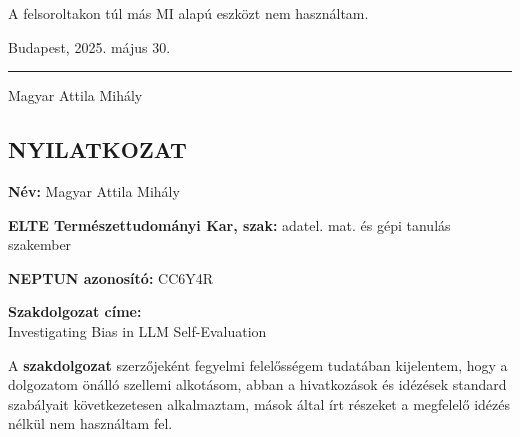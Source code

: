 \documentclass[UTF8,noindent,nohyp,parspace,titlepage,a4paper,12pt]{article}
\begin{document}
      A felsoroltakon túl más MI alapú eszközt nem használtam.

      \vspace{3em}

      \begin{minipage}[t]{0.5\linewidth}
        \begin{flushleft}
          Budapest, 2025. május 30.
        \end{flushleft}
      \end{minipage}
      \begin{minipage}[t]{0.5\linewidth}
        \begin{flushleft}
          \begin{center}
            \noindent\rule{\textwidth}{0.5pt}
            Magyar Attila Mihály
          \end{center}
        \end{flushleft}
      \end{minipage}

\clearpage

    \subsection*{\center\Large NYILATKOZAT \normalsize}

      \vspace{3em}

      \noindent\textbf{Név:} Magyar Attila Mihály

      \noindent\textbf{ELTE Természettudományi Kar, szak:} adatel. mat. és gépi
      tanulás szakember

      \noindent\textbf{NEPTUN azonosító:} CC6Y4R

      \noindent\textbf{Szakdolgozat címe:} \\
      Investigating Bias in LLM Self-Evaluation

      \vspace{5em}

      {
        \noindent A \textbf{szakdolgozat} szerzőjeként fegyelmi felelősségem
        tudatában kijelentem, hogy a \mbox{dolgozatom} önálló szellemi alkotásom,
        abban a hivatkozások és idézések standard szabályait következetesen
        alkalmaztam, mások által írt részeket a megfelelő idézés nélkül nem
        használtam fel.
      }

      \vspace{5em}
\end{document}
